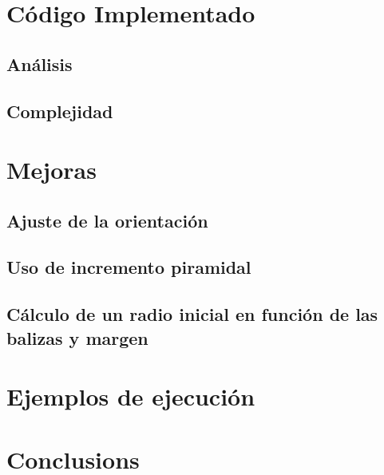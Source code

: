 


\section{Código Implementado}

\subsection{Análisis}

\subsection{Complejidad}


\section{Mejoras}

\subsection{Ajuste de la orientación}
\subsection{Uso de incremento piramidal}
\subsection{Cálculo de un radio inicial en función de las balizas y margen}

\section{Ejemplos de ejecución}

\section{Conclusions}

